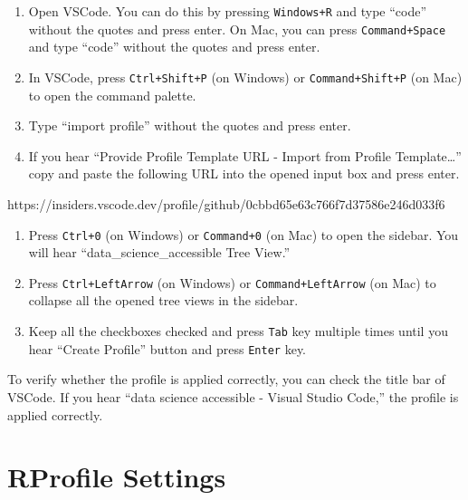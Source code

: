 \documentclass[
  letterpaper,
  DIV=11,
  numbers=noendperiod]{scrartcl}
\newenvironment{Shaded}{\begin{snugshade}}{\end{snugshade}}
\newcommand{\ExtensionTok}[1]{\textcolor[rgb]{0.00,0.23,0.31}{#1}}
\begin{document}
\begin{enumerate}
\def\labelenumi{\arabic{enumi}.}
\item
  Open VSCode. You can do this by pressing \texttt{Windows+R} and type
  ``code'' without the quotes and press enter. On Mac, you can press
  \texttt{Command+Space} and type ``code'' without the quotes and press
  enter.
\item
  In VSCode, press \texttt{Ctrl+Shift+P} (on Windows) or
  \texttt{Command+Shift+P} (on Mac) to open the command palette.
\item
  Type ``import profile'' without the quotes and press enter.
\item
  If you hear ``Provide Profile Template URL - Import from Profile
  Template\ldots{}'' copy and paste the following URL into the opened
  input box and press enter.
\end{enumerate}

\begin{Shaded}
\begin{Highlighting}[]
\ExtensionTok{https://insiders.vscode.dev/profile/github/0cbbd65e63c766f7d37586e246d033f6}
\end{Highlighting}
\end{Shaded}

\begin{enumerate}
\def\labelenumi{\arabic{enumi}.}
\setcounter{enumi}{4}
\item
  Press \texttt{Ctrl+0} (on Windows) or \texttt{Command+0} (on Mac) to
  open the sidebar. You will hear ``data\_science\_accessible Tree
  View.''
\item
  Press \texttt{Ctrl+LeftArrow} (on Windows) or
  \texttt{Command+LeftArrow} (on Mac) to collapse all the opened tree
  views in the sidebar.
\item
  Keep all the checkboxes checked and press \texttt{Tab} key multiple
  times until you hear ``Create Profile'' button and press
  \texttt{Enter} key.
\end{enumerate}

To verify whether the profile is applied correctly, you can check the
title bar of VSCode. If you hear ``data science accessible - Visual
Studio Code,'' the profile is applied correctly.

\hypertarget{sec-rprofile-settings}{%
\section{RProfile Settings}\label{sec-rprofile-settings}}
\end{document}
